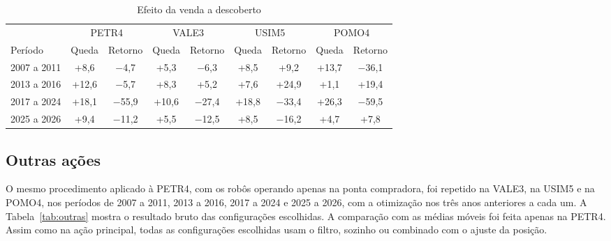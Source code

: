 \begin{table}[htbp]
\centering
\caption{Efeito da venda a descoberto}
\label{tab:venda}
\fontsize{10}{12}\selectfont
\begin{tabular}{l|c|c|c|c|c|c|c|c}
\hline
& \multicolumn{2}{c|}{PETR4} & \multicolumn{2}{c|}{VALE3} & \multicolumn{2}{c|}{USIM5} & \multicolumn{2}{c}{POMO4} \\
\cline{2-9}
Período & Queda & Retorno & Queda & Retorno & Queda & Retorno & Queda & Retorno \\
\hline
2007 a 2011 & +8,6 & $-$4,7 & +5,3 & $-$6,3 & +8,5 & +9,2 & +13,7 & $-$36,1 \\
\hline
2013 a 2016 & +12,6 & $-$5,7 & +8,3 & +5,2 & +7,6 & +24,9 & +1,1 & +19,4 \\
\hline
2017 a 2024 & +18,1 & $-$55,9 & +10,6 & $-$27,4 & +18,8 & $-$33,4 & +26,3 & $-$59,5 \\
\hline
2025 a 2026 & +9,4 & $-$11,2 & +5,5 & $-$12,5 & +8,5 & $-$16,2 & +4,7 & +7,8 \\
\hline
\end{tabular}
\end{table}

\FloatBarrier

\subsection{Outras ações}

O mesmo procedimento aplicado à PETR4, com os robôs operando apenas na ponta
compradora, foi repetido na VALE3, na USIM5 e na POMO4, nos períodos de 2007 a 2011, 2013 a 2016, 2017 a 2024 e 2025 a
2026, com a otimização nos três anos anteriores a cada um. A Tabela~\ref{tab:outras} mostra o
resultado bruto das configurações escolhidas. A comparação com as médias móveis
foi feita apenas na PETR4. Assim como na ação principal, todas as configurações
escolhidas usam o filtro, sozinho ou combinado com o ajuste da posição.

